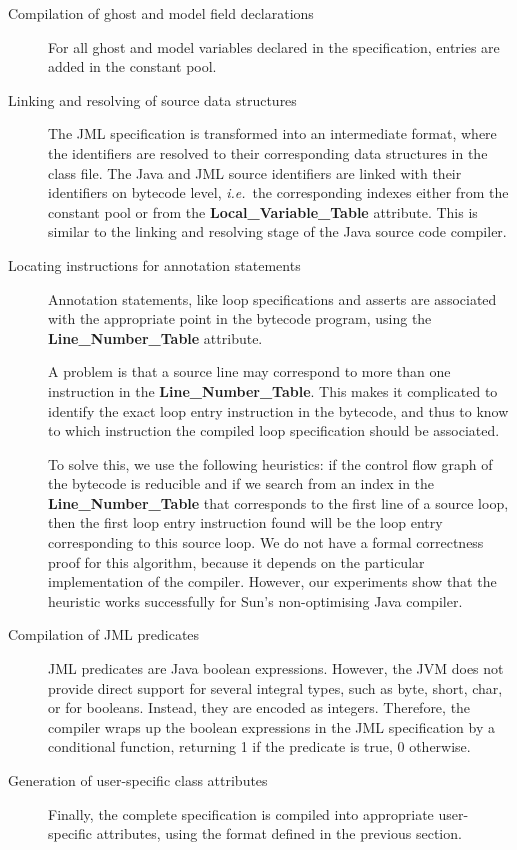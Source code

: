 \begin{description}

\item[Compilation of ghost and model field declarations] 
For all ghost and model variables declared in the specification,
entries are added in the constant pool. 


\item[Linking and resolving of source data structures]
The JML specification is transformed into an intermediate format,
where the identifiers are resolved to their corresponding data
structures in the class file.  The Java and JML source identifiers are
linked with their identifiers on bytecode level, \emph{i.e.}\ the
corresponding indexes either from the constant pool or from the
\textbf{Local\_Variable\_Table} attribute. This is similar to the
linking and resolving stage of the Java source code compiler.

\item[Locating instructions for annotation statements] 
Annotation statements, like loop specifications and asserts are
associated with the appropriate point in the bytecode program, using
the \textbf{Line\_Number\_Table} attribute.

A problem is that a source line may correspond to more than
one instruction in the \textbf{Line\_Number\_Table}. This makes it
complicated to identify the exact loop entry instruction in the
bytecode, and thus to know to which instruction the compiled loop
specification should be associated. 
 
To solve this, we use the following heuristics: if the control
flow graph of the bytecode is reducible and if we search from an index
in the \textbf{Line\_Number\_Table} that corresponds to the first line
of a source loop, then the first loop entry instruction found will be
the loop entry corresponding to this source loop.  We do not have a
formal correctness proof for this algorithm, because it depends on the
particular implementation of the compiler.  However, our experiments
show that the heuristic works successfully for Sun's non-optimising
Java compiler.
 
\item[Compilation of JML predicates]
JML predicates are Java boolean expressions. However, the JVM does not
provide direct support for several integral types, such as byte,
short, char, or for booleans. Instead, they are encoded as integers.
Therefore, the compiler wraps up the boolean expressions in the JML
specification by a conditional function, returning 1 if the predicate
is true, 0 otherwise.

\item[Generation of user-specific class attributes]
Finally, the complete specification is compiled into appropriate
user-specific attributes, using the format defined in the previous
section. 
    
\end{description}

